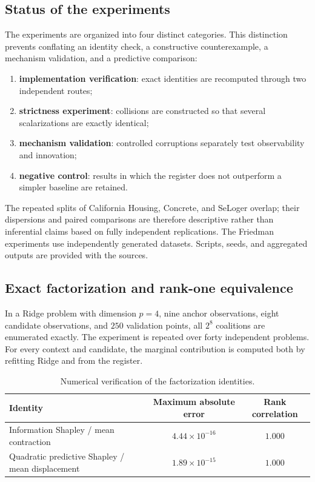 \documentclass[10pt,a4paper]{article}
\begin{document}
\subsection{Status of the experiments}
The experiments are organized into four distinct categories. This distinction prevents conflating an identity check, a constructive counterexample, a mechanism validation, and a predictive comparison:
\begin{enumerate}
  \item \textbf{implementation verification}: exact identities are recomputed through two independent routes;
  \item \textbf{strictness experiment}: collisions are constructed so that several scalarizations are exactly identical;
  \item \textbf{mechanism validation}: controlled corruptions separately test observability and innovation;
  \item \textbf{negative control}: results in which the register does not outperform a simpler baseline are retained.
\end{enumerate}
The repeated splits of California Housing, Concrete, and SeLoger overlap; their dispersions and paired comparisons are therefore descriptive rather than inferential claims based on fully independent replications. The Friedman experiments use independently generated datasets. Scripts, seeds, and aggregated outputs are provided with the sources.

\subsection{Exact factorization and rank-one equivalence}
\label{subsec:experiments-factorization}
In a Ridge problem with dimension $p=4$, nine anchor observations, eight candidate observations, and $250$ validation points, all $2^8$ coalitions are enumerated exactly. The experiment is repeated over forty independent problems. For every context and candidate, the marginal contribution is computed both by refitting Ridge and from the register.

\begin{table}[H]
\centering
\caption{Numerical verification of the factorization identities.}
\label{tab:exact-factorization}
\small
\begin{tabular}{@{}lcc@{}}
\toprule
Identity & Maximum absolute error & Rank correlation \\
\midrule
Information Shapley / mean contraction & $4.44\times10^{-16}$ & $1.000$ \\
Quadratic predictive Shapley / mean displacement & $1.89\times10^{-15}$ & $1.000$ \\
\bottomrule
\end{tabular}
\end{table}
\end{document}
